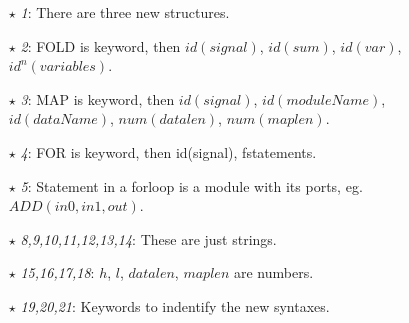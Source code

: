 \begin{itemize}\itemsep2pt \parskip0pt 
  \item[$\star$]\textit{1}: There are three new structures.
  \item[$\star$]\textit{2}: FOLD is keyword, then $id(signal)$, $id(sum)$, $id(var)$, $id^n(variables)$. 
  \item[$\star$]\textit{3}: MAP is keyword, then $id(signal)$, $id(moduleName)$, $id(dataName)$, $num(datalen)$, 
                            $num(maplen)$. 
  \item[$\star$]\textit{4}: FOR is keyword, then id(signal), fstatements.
  \item[$\star$]\textit{5}: Statement in a forloop is a module with its ports, eg. $ADD(in0, in1, out)$.
  \item[$\star$]\textit{8,9,10,11,12,13,14}: These are just strings.
  \item[$\star$]\textit{15,16,17,18}: $h$, $l$, $datalen$, $maplen$ are numbers.
  \item[$\star$]\textit{19,20,21}: Keywords to indentify the new syntaxes.
\end{itemize}
